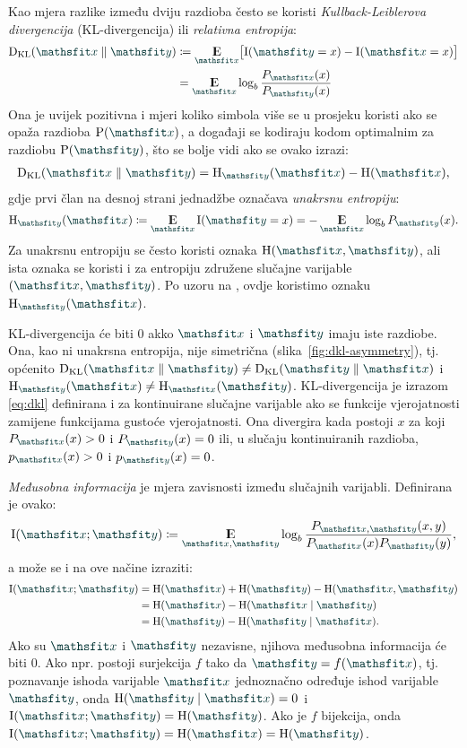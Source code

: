 \documentclass[utf8, diplomski, lmodern]{fer}
\begin{document}
Kao mjera razlike između dviju razdioba često se koristi \emph{Kullback-Leiblerova divergencija} (KL-divergencija) ili \emph{relativna entropija}:
\begin{align}
	\Dkl{\rvar x}{\rvar y} &\coloneqq \E_{\rvar x}\sbr{\I(\rvar y=x) - \I(\rvar x=x)} \\
	&= \E_{\rvar x} \log_b\frac{P_{\rvar x}(x)}{P_{\rvar y}(x)} \label{eq:dkl}
\end{align}
Ona je uvijek pozitivna i mjeri koliko simbola više se u prosjeku koristi ako se opaža razdioba $\P(\rvar x)$, a događaji se kodiraju kodom optimalnim za razdiobu $\P(\rvar y)$, što se bolje vidi ako se ovako izrazi:
\begin{align}
\Dkl{\rvar x}{\rvar y} = \H_{\rvar y}(\rvar x) - \H(\rvar x),
\end{align}
gdje prvi član na desnoj strani jednadžbe označava \emph{unakrsnu entropiju}:
\begin{align}
\H_{\rvar y}(\rvar x)\coloneqq \E_{\rvar x}\I(\rvar y=x) = -\E_{\rvar x}\log_b P_{\rvar y}(x).
\end{align}
Za unakrsnu entropiju se često koristi oznaka $\H(\rvar x,\rvar y)$, ali ista oznaka se koristi i za entropiju združene slučajne varijable $(\rvar x,\rvar y)$. Po uzoru na \citet{Olah:2015:VIT}, ovdje koristimo oznaku $\H_{\rvar y}(\rvar x)$.

KL-divergencija će biti $0$ akko $\rvar x$ i $\rvar y$ imaju iste razdiobe. Ona, kao ni unakrsna entropija, nije simetrična (slika~\ref{fig:dkl-asymmetry}), tj. općenito $\Dkl{\rvar x}{\rvar y}\neq\Dkl{\rvar y}{\rvar x}$ i $\H_{\rvar y}(\rvar x)\neq\H_{\rvar x}(\rvar y)$. KL-divergencija je izrazom \eqref{eq:dkl} definirana i za kontinuirane slučajne varijable ako se funkcije vjerojatnosti zamijene funkcijama gustoće vjerojatnosti. Ona divergira kada postoji $x$ za koji $P_{\rvar x}(x)>0$ i $P_{\rvar y}(x)=0$ ili, u slučaju kontinuiranih razdioba, $p_{\rvar x}(x)>0$ i $p_{\rvar y}(x)=0$.

\emph{Međusobna informacija} je mjera zavisnosti između slučajnih varijabli. Definirana je ovako:
\begin{align}
\I\del{\rvar x;\rvar y} \coloneqq \E_{\rvar x, \rvar y} \log_b\frac{P_{\rvar x, \rvar y}(x, y)}{P_{\rvar x}(x)P_{\rvar y}(y)},
\label{eq:mutinf}
\end{align}
a može se i na ove načine izraziti:
\begin{align}
\I(\rvar x;\rvar y)
&= \H(\rvar x)+\H(\rvar y)-\H(\rvar x, \rvar y) \\
&= \H(\rvar x)-\H(\rvar x\mid \rvar y) \\ 
&= \H(\rvar y)-\H(\rvar y\mid\rvar x).
\label{eq:mutinf2}
\end{align}
Ako su $\rvar x$ i $\rvar y$ nezavisne, njihova međusobna informacija će biti $0$. Ako npr. postoji surjekcija $f$ tako da $\rvar y=f(\rvar x)$, tj. poznavanje ishoda varijable $\rvar x$ jednoznačno određuje ishod varijable $\rvar y$, onda $\H(\rvar y\mid\rvar x)=0$ i $\I(\rvar x;\rvar y) = \H(\rvar y)$. Ako je $f$ bijekcija, onda $\I(\rvar x;\rvar y) = \H(\rvar x) = \H(\rvar y)$.
\end{document}
